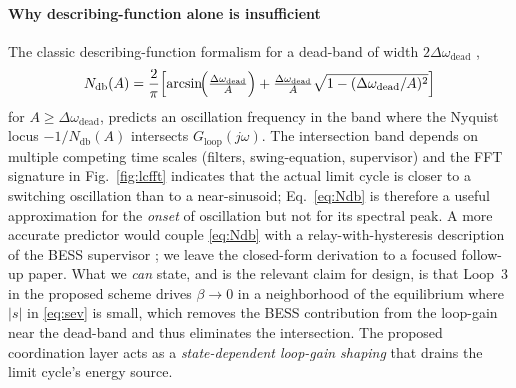 \documentclass[journal]{IEEEtran}
\begin{document}
\paragraph*{Why describing-function alone is insufficient} The classic
describing-function formalism for a dead-band of width
$2\Delta\omega_\mathrm{dead}$ \cite{atherton1975nonlinear,
atherton2019deadband},
\begin{equation}
N_\mathrm{db}(A) =
\frac{2}{\pi}\Bigl[\arcsin\!\Bigl(\tfrac{\Delta\omega_\mathrm{dead}}{A}\Bigr)
+\tfrac{\Delta\omega_\mathrm{dead}}{A}\sqrt{1-(\Delta\omega_\mathrm{dead}/A)^2}\Bigr]
\label{eq:Ndb}
\end{equation}
for $A\geq\Delta\omega_\mathrm{dead}$, predicts an oscillation
frequency in the band where the Nyquist locus
$-1/N_\mathrm{db}(A)$ intersects $G_\mathrm{loop}(j\omega)$. The
intersection band depends on multiple competing time scales (filters,
swing-equation, supervisor) and the FFT signature in
Fig.~\ref{fig:lcfft} indicates that the actual limit cycle is closer
to a switching oscillation than to a near-sinusoid; Eq.~\eqref{eq:Ndb}
is therefore a useful approximation for the \emph{onset} of
oscillation but not for its spectral peak. A more accurate predictor
would couple \eqref{eq:Ndb} with a relay-with-hysteresis description
of the BESS supervisor \cite{khalil2002nonlinear}; we leave the
closed-form derivation to a focused follow-up paper. What we
\emph{can} state, and is the relevant claim for design, is that
Loop~3 in the proposed scheme drives $\beta\to 0$ in a neighborhood
of the equilibrium where $|s|$ in \eqref{eq:sev} is small, which
removes the BESS contribution from the loop-gain near the dead-band
and thus eliminates the intersection. The proposed coordination layer
acts as a \emph{state-dependent loop-gain shaping} that drains the
limit cycle's energy source.
\end{document}
